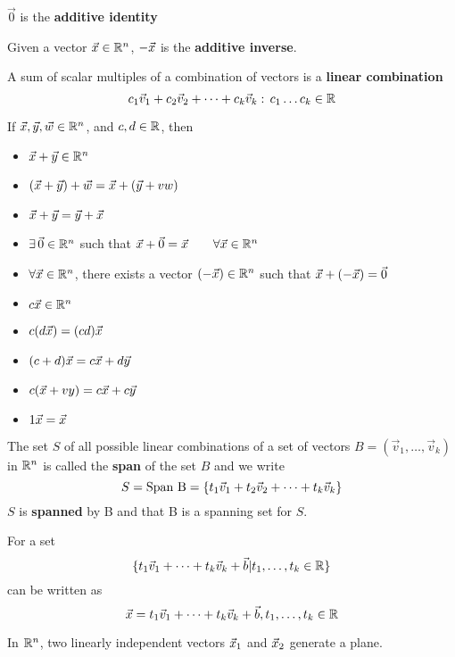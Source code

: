 \documentclass[english, 12pt]{article}
\begin{document}
\begin{defn}
$\vec{0}$ is the \textbf{additive identity}
\end{defn}
\begin{defn}
Given a vector $\vec{x} \in {\mathbb{R}}^n$, $-\vec{x}$ is the \textbf{additive inverse}.
\end{defn}
\begin{defn}
A sum of scalar multiples of a combination of vectors is a \textbf{linear combination}
\[c_{1} \vec{v}_{1} + c_{2} \vec{v}_{2} + \cdots + c_{k} \vec{v}_{k}:\,c_{1}\dots c_{k} \in {\mathbb{R}}\]
\end{defn}
\begin{thrm}
If $\vec{x},\vec{y},\vec{w} \in {\mathbb{R}}^n$, and $c,d \in {\mathbb{R}}$, then
\begin{itemize}
\item $\vec{x} + \vec{y} \in {\mathbb{R}}^n$
\item $(\vec{x} + \vec{y}) + \vec{w} = \vec{x} + (\vec{y} + vw)$
\item $\vec{x} + \vec{y} = \vec{y} + \vec{x}$
\item $\exists\, \vec{0} \in {\mathbb{R}}^n$ such that $\vec{x} + \vec{0} = \vec{x}\qquad\forall \vec{x} \in {\mathbb{R}}^n$
\item $\forall \vec{x} \in {\mathbb{R}}^n$, there exists a vector $(- \vec{x}) \in {\mathbb{R}}^n$ such that $\vec{x} + (- \vec{x}) = \vec{0}$
\item $c \vec{x} \in {\mathbb{R}}^n$
\item $c (d \vec{x}) = (cd) \vec{x}$
\item $(c+d) \vec{x} = c \vec{x} + d \vec{y}$
\item $c (\vec{x} + vy) = c \vec{x} + c \vec{y}$
\item $1 \vec{x} = \vec{x}$
\end{itemize}
\end{thrm}


\begin{defn}
The set $S$ of all possible linear combinations of a set of vectors $B = (\vec{v}_{1} , \dots , \vec{v}_{k})$ in ${\mathbb{R}}^n$ is called the \textbf{span} of the set $B$ and we write
\[S = \text{Span B} =\{t_{1} \vec{v}_{1} + t_{2} \vec{v}_{2} + \cdots + t_{k}\vec{v}_{k}\}\]
$S$ is \textbf{spanned} by B and that B is a spanning set for $S$.
\end{defn}


For a set 
\[  \{t_{1} \vec{v}_{1} + \dots + t_{k} \vec{v}_{k} + \vec{b} | t_{1},\dots,t_{k} \in {\mathbb{R}} \}\]
can be written as 
\[  \vec{x} = t_{1} \vec{v}_{1} + \dots + t_{k} \vec{v}_{k} + \vec{b} , t_{1},\dots,t_{k} \in {\mathbb{R}}\]

In ${\mathbb{R}}^n$, two linearly independent vectors $\vec{x}_{1}$ and $\vec{x}_{2}$ generate a plane.
\end{document}
